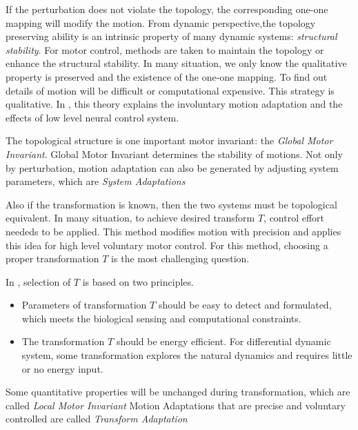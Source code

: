 If the perturbation does not violate the topology, the corresponding one-one mapping will modify the motion.
From dynamic perspective,the topology preserving ability is an intrinsic property of many dynamic systems:
\emph{structural stability}.
For motor control, methods are taken to maintain the topology or enhance the structural stability.
In many situation, we only know the qualitative property is preserved and the existence of the one-one mapping.
To find out details of motion will be difficult or computational expensive.
This strategy is qualitative.
In \moit, this theory explains the involuntary motion adaptation and the effects of low level neural control system.

The topological structure is one important motor invariant: the \emph{Global Motor Invariant}.
Global Motor Invariant determines the stability of motions.
Not only by perturbation, motion adaptation can also be generated by adjusting system parameters, which are \emph{System Adaptations}





Also if the transformation is known, then the two systems must be topological equivalent.
In many situation, to achieve desired transform $T$, control effort neededs to be applied.
This method  modifies motion with precision and \moit applies this idea for high level voluntary motor control.
For this method, choosing a proper transformation $T$ is the most challenging  question.

In \moit, selection of $T$ is based on two principles.
\begin{itemize}
\item
Parameters of transformation $T$ should be easy to detect and formulated, which meets the biological sensing and computational constraints. 

\item 
The transformation $T$ should be energy efficient.
For differential dynamic system, some transformation explores the natural dynamics and requires little or no energy input.
\end{itemize}

Some quantitative properties will be unchanged during transformation, which are called \emph{Local Motor Invariant}
Motion Adaptations that are precise and voluntary controlled are called \emph{Transform Adaptation}





%
%
%
%
%




